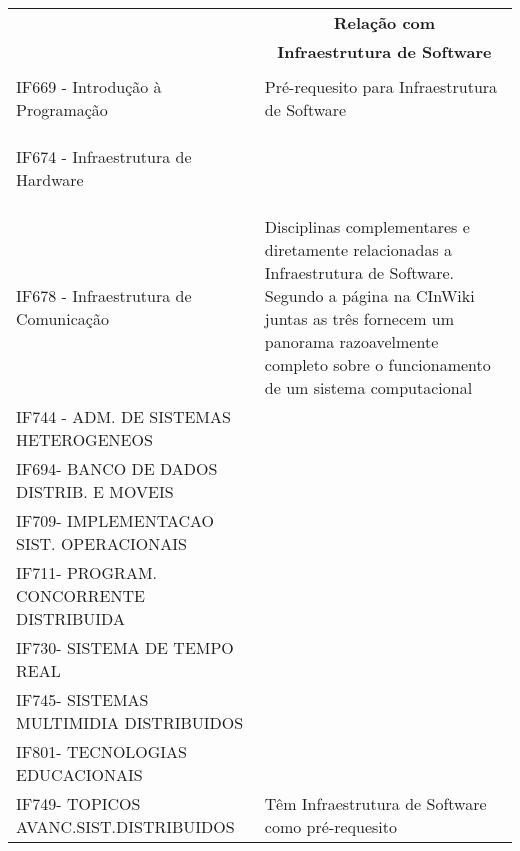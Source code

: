 \documentclass[10pt]{article}
\begin{document}
\begin{table}[h]
\begin{tabularx}{\linewidth}{|l|X|}
\hline
\rowcolor[HTML]{C0C0C0} 
\multicolumn{1}{|c|}{\cellcolor[HTML]{C0C0C0}} & \multicolumn{1}{c|}{\cellcolor[HTML]{C0C0C0}\textbf{Relação com}} \\
\rowcolor[HTML]{C0C0C0} 
\multicolumn{1}{|c|}{\multirow{-2}{*}{\cellcolor[HTML]{C0C0C0}\textbf{Disciplina}}} & \multicolumn{1}{c|}{\cellcolor[HTML]{C0C0C0}\textbf{Infraestrutura de Software}} \\ \hline
 &  \\
\multirow{-2}{*}{IF669 - Introdução à Programação} & \multirow{-2}{=}{Pré-requesito para Infraestrutura de Software} \\ \hline
 &  \\
 &  \\
 &  \\
\multirow{-4}{*}{IF674 - Infraestrutura de Hardware} &  \\ \cline{1-1}
 &  \\
 &  \\
 &  \\
\multirow{-4}{*}{IF678 - Infraestrutura de Comunicação} & \multirow{-8}{=}{Disciplinas complementares e diretamente relacionadas a Infraestrutura de Software. Segundo a página na CInWiki \cite{cinwiki-infrasoft} juntas as três fornecem um panorama razoavelmente completo sobre o funcionamento de um sistema computacional} \\ \hline
IF744 - ADM. DE SISTEMAS HETEROGENEOS &  \\ \cline{1-1}
IF694- BANCO DE DADOS DISTRIB. E MOVEIS &  \\ \cline{1-1}
IF709- IMPLEMENTACAO SIST. OPERACIONAIS &  \\ \cline{1-1}
IF711- PROGRAM. CONCORRENTE DISTRIBUIDA &  \\ \cline{1-1}
IF730- SISTEMA DE TEMPO REAL &  \\ \cline{1-1}
IF745- SISTEMAS MULTIMIDIA DISTRIBUIDOS &  \\ \cline{1-1}
IF801- TECNOLOGIAS EDUCACIONAIS &  \\ \cline{1-1}
IF749- TOPICOS AVANC.SIST.DISTRIBUIDOS & \multirow{-8}{=}{Têm Infraestrutura de Software como pré-requesito} \\ \hline
\end{tabularx}
\end{table}

\newpage

\printbibliography
\end{document}
